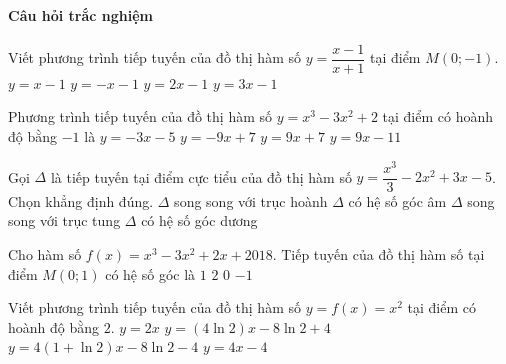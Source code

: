 \paragraph{Câu hỏi trắc nghiệm}
\begin{ex}%
	Viết phương trình tiếp tuyến của đồ thị hàm số $y=\dfrac{x-1}{x+1}$ tại điểm $M(0;-1)$. 
	\choice
	{$y=x-1$}
	{$y=-x-1$}
	{\True $y=2x-1$}
	{$y=3x-1$}
\end{ex}
\begin{ex}%
	Phương trình tiếp tuyến của đồ thị hàm số $y=x^3-3x^2+2$ tại điểm có hoành độ bằng $-1$ là
	\choice
	{$y=-3x-5$}
	{$y=-9x+7$}
	{\True $y=9x+7$}
	{$y=9x-11$}
\end{ex}
\begin{ex}%
	Gọi $\Delta$ là tiếp tuyến tại điểm cực tiểu của đồ thị hàm số $y=\dfrac{x^3}{3}-2x^2+3x-5$. Chọn khẳng định đúng. 
	\choice
	{\True $\Delta$ song song với trục hoành}
	{$\Delta$ có hệ số góc âm}
	{$\Delta$ song song với trục tung}
	{$\Delta$ có hệ số góc dương}
\end{ex}
\begin{ex}%
	Cho hàm số $f(x)=x^3-3x^2+2x+2018$. Tiếp tuyến của đồ thị hàm số tại điểm $M(0;1)$ có hệ số góc là 
	\choice
	{$1$}
	{\True $2$}
	{$0$}
	{$-1$}
\end{ex}
\begin{ex}%
	Viết phương trình tiếp tuyến của đồ thị hàm số $y=f(x)=x^2$ tại điểm có hoành độ bằng $2$. 
	\choice
	{$y=2x$}
	{$y=(4\ln 2)x-8\ln 2+4$}
	{$y=4(1+\ln 2)x-8\ln 2-4$}
	{\True $y=4x-4$}
\end{ex}
